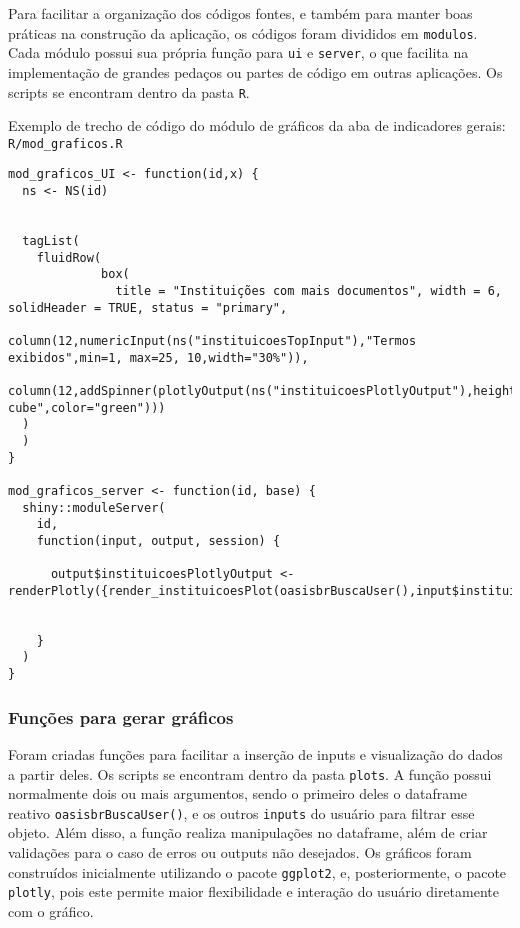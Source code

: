 \documentclass[
]{article}
\begin{document}
Para facilitar a organização dos códigos fontes, e também para manter
boas práticas na construção da aplicação, os códigos foram divididos em
\texttt{modulos}. Cada módulo possui sua própria função para \texttt{ui}
e \texttt{server}, o que facilita na implementação de grandes pedaços ou
partes de código em outras aplicações. Os scripts se encontram dentro da
pasta \texttt{R}.

Exemplo de trecho de código do módulo de gráficos da aba de indicadores
gerais: \texttt{R/mod\_graficos.R}

\begin{verbatim}
mod_graficos_UI <- function(id,x) {
  ns <- NS(id)
  

  tagList(
    fluidRow(
             box(
               title = "Instituições com mais documentos", width = 6, solidHeader = TRUE, status = "primary",
               column(12,numericInput(ns("instituicoesTopInput"),"Termos exibidos",min=1, max=25, 10,width="30%")),
               column(12,addSpinner(plotlyOutput(ns("instituicoesPlotlyOutput"),height="300px"),spin="folding-cube",color="green")))
  )
  )
}

mod_graficos_server <- function(id, base) {
  shiny::moduleServer(
    id,
    function(input, output, session) {
      
      output$instituicoesPlotlyOutput <- renderPlotly({render_instituicoesPlot(oasisbrBuscaUser(),input$instituicoesTopInput)})
      
      
    }
  )
}
\end{verbatim}

\hypertarget{funuxe7uxf5es-para-gerar-gruxe1ficos}{%
\subsubsection{Funções para gerar
gráficos}\label{funuxe7uxf5es-para-gerar-gruxe1ficos}}

Foram criadas funções para facilitar a inserção de inputs e visualização
do dados a partir deles. Os scripts se encontram dentro da pasta
\texttt{plots}. A função possui normalmente dois ou mais argumentos,
sendo o primeiro deles o dataframe reativo \texttt{oasisbrBuscaUser()},
e os outros \texttt{inputs} do usuário para filtrar esse objeto. Além
disso, a função realiza manipulações no dataframe, além de criar
validações para o caso de erros ou outputs não desejados. Os gráficos
foram construídos inicialmente utilizando o pacote \texttt{ggplot2}, e,
posteriormente, o pacote \texttt{plotly}, pois este permite maior
flexibilidade e interação do usuário diretamente com o gráfico.
\end{document}
